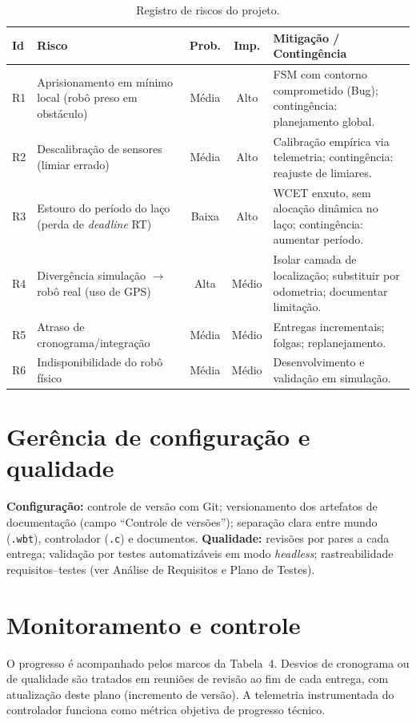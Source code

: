 \begin{table}[H]\centering
\caption{Registro de riscos do projeto.}
\label{tab:riscos}
\renewcommand{\arraystretch}{1.2}
\begin{tabularx}{\textwidth}{@{}l X c c X@{}}
\toprule
\textbf{Id} & \textbf{Risco} & \textbf{Prob.} & \textbf{Imp.} & \textbf{Mitigação / Contingência} \\
\midrule
R1 & Aprisionamento em mínimo local (robô preso em obstáculo) & Média & Alto & FSM com contorno comprometido (Bug); contingência: planejamento global. \\
R2 & Descalibração de sensores (limiar errado) & Média & Alto & Calibração empírica via telemetria; contingência: reajuste de limiares. \\
R3 & Estouro do período do laço (perda de \emph{deadline} RT) & Baixa & Alto & WCET enxuto, sem alocação dinâmica no laço; contingência: aumentar período. \\
R4 & Divergência simulação $\to$ robô real (uso de GPS) & Alta & Médio & Isolar camada de localização; substituir por odometria; documentar limitação. \\
R5 & Atraso de cronograma/integração & Média & Médio & Entregas incrementais; folgas; replanejamento. \\
R6 & Indisponibilidade do robô físico & Média & Médio & Desenvolvimento e validação em simulação. \\
\bottomrule
\end{tabularx}
\end{table}

\section{Gerência de configuração e qualidade}
\textbf{Configuração:} controle de versão com Git; versionamento dos artefatos de documentação (campo ``Controle de versões''); separação clara entre mundo (\texttt{.wbt}), controlador (\texttt{.c}) e documentos. \textbf{Qualidade:} revisões por pares a cada entrega; validação por testes automatizáveis em modo \emph{headless}; rastreabilidade requisitos--testes (ver Análise de Requisitos e Plano de Testes).

\section{Monitoramento e controle}
O progresso é acompanhado pelos marcos da Tabela~4. Desvios de cronograma ou de qualidade são tratados em reuniões de revisão ao fim de cada entrega, com atualização deste plano (incremento de versão). A telemetria instrumentada do controlador funciona como métrica objetiva de progresso técnico.


